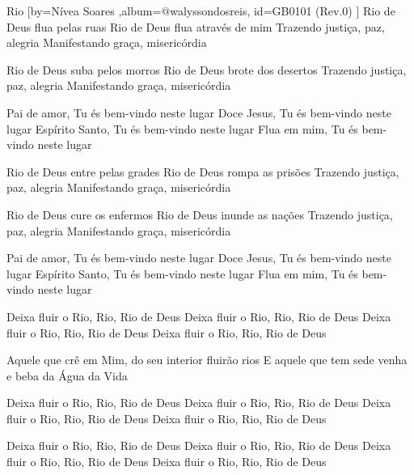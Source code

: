 \beginsong
{Rio %
}[by={Nívea Soares %
},album={@walyssondosreis},
id={GB0101 %
(Rev.0) %
}]
Rio de Deus flua pelas ruas
Rio de Deus flua através de mim
Trazendo justiça, paz, alegria
Manifestando graça, misericórdia

Rio de Deus suba pelos morros
Rio de Deus brote dos desertos
Trazendo justiça, paz, alegria
Manifestando graça, misericórdia

Pai de amor, Tu és bem-vindo neste lugar
Doce Jesus, Tu és bem-vindo neste lugar
Espírito Santo, Tu és bem-vindo neste lugar
Flua em mim, Tu és bem-vindo neste lugar

Rio de Deus entre pelas grades
Rio de Deus rompa as prisões
Trazendo justiça, paz, alegria
Manifestando graça, misericórdia

Rio de Deus cure os enfermos
Rio de Deus inunde as nações
Trazendo justiça, paz, alegria
Manifestando graça, misericórdia

Pai de amor, Tu és bem-vindo neste lugar
Doce Jesus, Tu és bem-vindo neste lugar
Espírito Santo, Tu és bem-vindo neste lugar
Flua em mim, Tu és bem-vindo neste lugar

Deixa fluir o Rio, Rio, Rio de Deus
Deixa fluir o Rio, Rio, Rio de Deus
Deixa fluir o Rio, Rio, Rio de Deus
Deixa fluir o Rio, Rio, Rio de Deus

Aquele que crê em Mim, do seu interior fluirão rios
E aquele que tem sede venha e beba da Água da Vida

Deixa fluir o Rio, Rio, Rio de Deus
Deixa fluir o Rio, Rio, Rio de Deus
Deixa fluir o Rio, Rio, Rio de Deus
Deixa fluir o Rio, Rio, Rio de Deus

Deixa fluir o Rio, Rio, Rio de Deus
Deixa fluir o Rio, Rio, Rio de Deus
Deixa fluir o Rio, Rio, Rio de Deus
Deixa fluir o Rio, Rio, Rio de Deus


